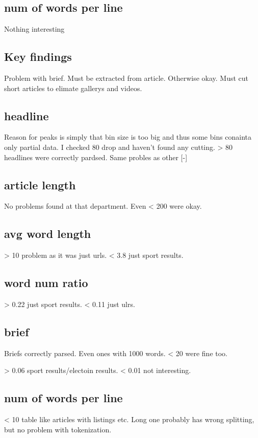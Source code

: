 \documentclass{article}
\begin{document}
    \subsection{num of words per line}
    Nothing interesting

    \subsection{Key findings}
    Problem with brief. Must be extracted from article. Otherwise okay.
    Must cut short articles to elimate gallerys and videos.

    \subsection{headline}
    Reason for peaks is simply that bin size is too big and thus some bins conainta only partial data. I checked 80 drop and haven't found any cutting.
    > 80 headlines were correctly pardsed. Same probles as other [-]

    \subsection{article length}
    No problems found at that department. Even < 200 were okay.

    \subsection{avg word length}
    > 10 problem as it was just urls. < 3.8  just sport results.

    \subsection{word num ratio}
    > 0.22 just sport results. < 0.11 just ulrs.

    \subsection{brief}
    Briefs correctly parsed.  Even ones with 1000 words. < 20 were fine too.

    > 0.06 sport results/electoin results. < 0.01 not interesting.

    \subsection{num of words per line}
    < 10 table like articles with listings etc. Long one probably has wrong splitting, but no problem with tokenization.
\end{document}
